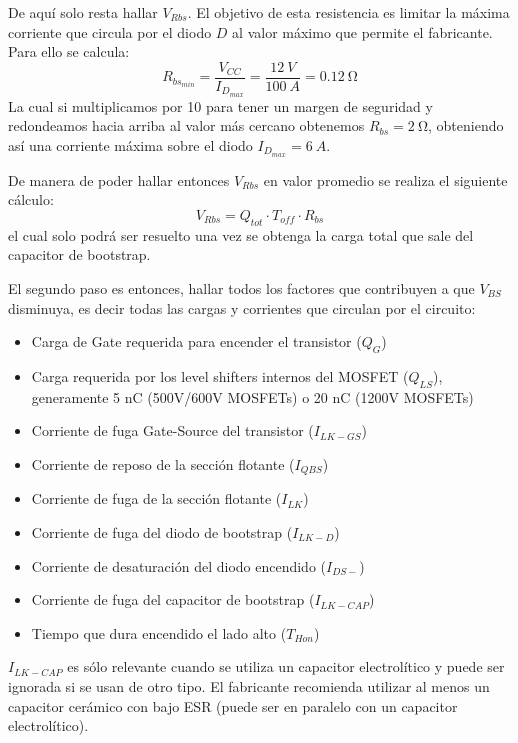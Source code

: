 \documentclass[../et.tex]{subfiles}
\begin{document}
  De aquí solo resta hallar $V_{Rbs}$. El objetivo de esta resistencia es limitar la máxima corriente que circula por el diodo $D$ al valor máximo que permite el fabricante. Para ello se calcula:
    \[
      R_{bs_{min}} = \frac{V_{CC}}{I_{D_{max}}} = \frac{\SI{12}{V}}{\SI{100}{A}} = \SI{0.12}{\ohm}
    \]
  La cual si multiplicamos por 10 para tener un margen de seguridad y redondeamos hacia arriba al valor más cercano obtenemos $R_{bs} = \SI{2}{\ohm}$, obteniendo así una corriente máxima sobre el diodo $I_{D_{max}} = \SI{6}{A}$.

  De manera de poder hallar entonces $V_{Rbs}$ en valor promedio se realiza el siguiente cálculo:
    \begin{equation}
      \label{eq:bootstrap-vrbs}
      V_{Rbs} = Q_{tot} \cdot T_{off} \cdot R_{bs}
    \end{equation}
  el cual solo podrá ser resuelto una vez se obtenga la carga total que sale del capacitor de bootstrap.

  El segundo paso es entonces, hallar todos los factores que contribuyen a que $V_{BS}$ disminuya, es decir todas las cargas y corrientes que circulan por el circuito:
    \begin{itemize}
      \item Carga de Gate requerida para encender el transistor ($Q_G$)
      \item Carga requerida por los level shifters internos del MOSFET ($Q_{LS}$), generamente 5 nC (500V/600V MOSFETs) o 20 nC (1200V MOSFETs)
      \item Corriente de fuga Gate-Source del transistor ($I_{LK-GS}$)
      \item Corriente de reposo de la sección flotante ($I_{QBS}$)
      \item Corriente de fuga de la sección flotante ($I_{LK}$)
      \item Corriente de fuga del diodo de bootstrap ($I_{LK-D}$)
      \item Corriente de desaturación del diodo encendido ($I_{DS-}$)
      \item Corriente de fuga del capacitor de bootstrap ($I_{LK-CAP}$)
      \item Tiempo que dura encendido el lado alto ($T_{Hon}$)
    \end{itemize}
  $I_{LK-CAP}$ es sólo relevante cuando se utiliza un capacitor electrolítico y puede ser ignorada si se usan de otro tipo. El fabricante recomienda utilizar al menos un capacitor cerámico con bajo ESR (puede ser en paralelo con un capacitor electrolítico).
\end{document}
